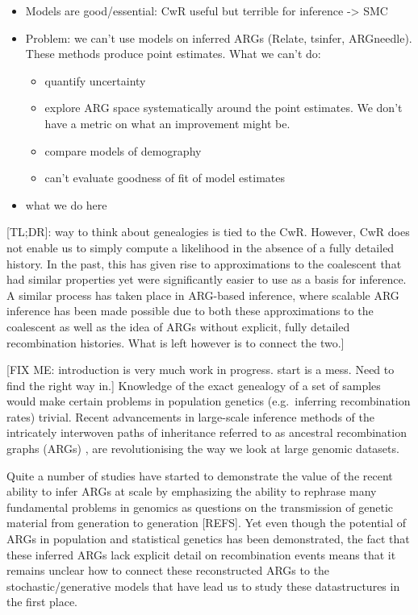 \documentclass{article}
\begin{document}
\begin{itemize}
    \item Models are good/essential: CwR useful but terrible for inference -> SMC
    \item Problem: we can't use models on inferred ARGs (Relate, tsinfer, ARGneedle). These methods produce point estimates. What we can't do:
        \begin{itemize}
            \item quantify uncertainty
            \item explore ARG space systematically around the point estimates. We don't have a metric on what an improvement might be.
            \item compare models of demography
            \item can't evaluate goodness of fit of model estimates
        \end{itemize}
    \item what we do here
\end{itemize}


[TL;DR]: way to think about genealogies is tied to the CwR. However,
CwR does not enable us to simply compute a likelihood in the absence of a fully
detailed history. In the past, this has given rise to approximations to the
coalescent that had similar properties yet were significantly easier to use
as a basis for inference.
A similar process has taken place in ARG-based inference,
where scalable ARG inference has been made possible due to both these approximations
to the coalescent as well as the idea of ARGs without explicit, fully detailed
recombination histories. What is left however is to connect the two.]


[FIX ME: introduction is very much work in progress.
start is a mess. Need to find the right way in.]
Knowledge of the exact genealogy of a set of samples would make certain problems
in population genetics (e.g.\ inferring recombination rates) trivial.
Recent advancements in large-scale inference methods of the intricately
interwoven paths of inheritance referred to as ancestral recombination graphs (ARGs)
\citep{rasmussen_genome-wide_2014, heine_bridging_2018,
kelleher_inferring_2019, speidel_method_2019, rasmussen_espalier_2022, zhang_biobank-scale_2023},
are revolutionising the way we look at large genomic datasets.

Quite a number of studies have started to demonstrate the value of the recent ability to
infer ARGs at scale by emphasizing the ability to rephrase many fundamental problems
in genomics as questions on the transmission of genetic material from generation
to generation [REFS].
Yet even though the potential of ARGs in population and statistical genetics has
been demonstrated, the fact that these inferred ARGs lack explicit detail on
recombination events means that it remains unclear how to connect these
reconstructed ARGs to the stochastic/generative models that have lead us
to study these datastructures in the first place.
\end{document}
